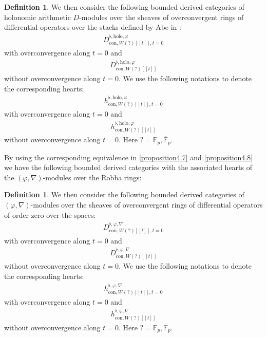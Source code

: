 \documentclass[11pt]{book}
\theoremstyle{definition}
\newtheorem{definition}[theorem]{Definition}
\numberwithin{equation}{section}
\begin{document}
\begin{definition}
We then consider the following bounded derived categories of holonomic arithmetic $D$-modules over the sheaves of overconvergent rings of differential operators over the stacks defined by Abe in \cite[Chapter 2.1]{Abe}:
\begin{align}
D^{\flat,\mathrm{holo},\varphi}_{\mathrm{con},W(?)[[t]],t=0}
\end{align}
with overconvergence along $t=0$ and 
\begin{align}
D^{\flat,\mathrm{holo},\varphi}_{\mathrm{con},W(?)[[t]]}
\end{align}
without overconvergence along $t=0$. We use the following notations to denote the corresponding hearts:
\begin{align}
h^{\flat,\mathrm{holo},\varphi}_{\mathrm{con},W(?)[[t]],t=0}
\end{align}
with overconvergence along $t=0$ and 
\begin{align}
h^{\flat,\mathrm{holo},\varphi}_{\mathrm{con},W(?)[[t]]}
\end{align}
without overconvergence along $t=0$. Here $?=\mathbb{F}_p,\overline{\mathbb{F}}_p$.
\end{definition}











\indent By using the corresponding equivalence in \cref{proposition4.7} and \cref{proposition4.8} we have the following bounded derived categories with the associated hearts of the $(\varphi,\nabla)$-modules over the Robba rings:



\begin{definition}
We then consider the following bounded derived categories of $(\varphi,\nabla)$-modules over the sheaves of overconvergent rings of differential operators of order zero over the spaces:
\begin{align}
D^{\flat,\varphi,\nabla}_{\mathrm{con},W(?)[[t]],t=0}
\end{align}
with overconvergence along $t=0$ and 
\begin{align}
D^{\flat,\varphi,\nabla}_{\mathrm{con},W(?)[[t]]}
\end{align}
without overconvergence along $t=0$. We use the following notations to denote the corresponding hearts:
\begin{align}
h^{\flat,\varphi,\nabla}_{\mathrm{con},W(?)[[t]],t=0}
\end{align}
with overconvergence along $t=0$ and 
\begin{align}
h^{\flat,\varphi,\nabla}_{\mathrm{con},W(?)[[t]]}
\end{align}
without overconvergence along $t=0$. Here $?=\mathbb{F}_p,\overline{\mathbb{F}}_p$.
\end{definition}
\end{document}
